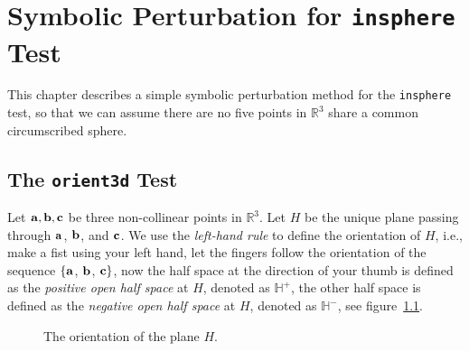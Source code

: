 \chapter{Symbolic Perturbation for {\tt insphere} Test}

This chapter describes a simple symbolic perturbation method for the {\tt insphere} test, so that we can assume there are no five points in $\mathbb{R}^3$ share a common circumscribed sphere. 

\section{The {\tt orient3d} Test}

Let ${\bf a}, {\bf b}, {\bf c}$ be three non-collinear points in $\mathbb{R}^3$.  Let $H$ be the unique plane passing through ${\bf a}$, ${\bf b}$, and ${\bf c}$. We use the {\it left-hand rule} to define the orientation of $H$, i.e., make a fist using your left hand, let the fingers follow the orientation of the sequence $\{{\bf a}$, ${\bf b}$, ${\bf c}\}$, now the half space at the direction of your thumb is defined as the {\it positive open half space} at $H$, denoted as $\mathbb{H}^+$, the other half space is defined as the {\it negative open half space} at $H$, denoted as $\mathbb{H}^-$, see figure~\ref{fig:orient3d}.

\begin{figure}
\caption{The orientation of the plane $H$.}
\label{fig:orient3d}
\end{figure}

